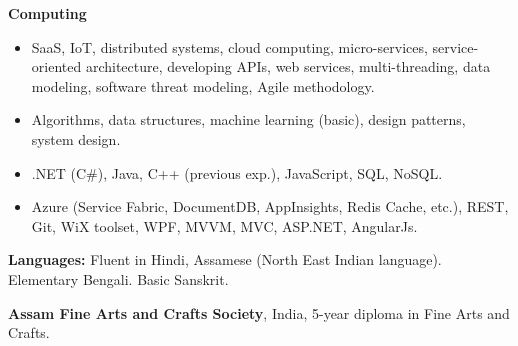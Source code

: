 \documentclass[letterpaper,10pt]{article}
\newcommand{\resumeItemListStart}{\begin{itemize}}
\newcommand{\resumeItemListEnd}{\end{itemize}}
\newcommand{\resumeListItem}[1]{
	\item{#1 \vspace{-6pt}}
}
\begin{document}
	\textbf{Computing}\vspace{-8pt}
	\resumeItemListStart
	\resumeListItem {SaaS, IoT, distributed systems, cloud computing, micro-services, service-oriented architecture, developing APIs, web services, multi-threading, data modeling, software threat modeling, Agile methodology.}
	\resumeListItem {Algorithms, data structures, machine learning (basic), design patterns, system design.}
	\resumeListItem {.NET (C\#), Java, C++ (previous exp.), JavaScript, SQL, NoSQL.}
	\resumeListItem {Azure (Service Fabric, DocumentDB, AppInsights, Redis Cache, etc.), REST, Git, WiX toolset, WPF, MVVM, MVC, ASP.NET, AngularJs.}
	\resumeItemListEnd

	\textbf{Languages:} Fluent in Hindi, Assamese (North East Indian language). Elementary Bengali. Basic Sanskrit.

	\textbf{Assam Fine Arts and Crafts Society}, India, 5-year diploma in Fine Arts and Crafts.

\end{document}
